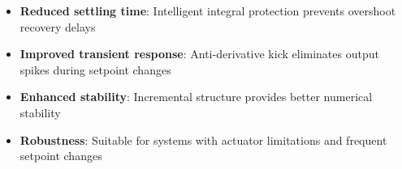 \documentclass{article}
\begin{document}
\begin{itemize}
    \item \textbf{Reduced settling time}: Intelligent integral protection prevents overshoot recovery delays
    \item \textbf{Improved transient response}: Anti-derivative kick eliminates output spikes during setpoint changes
    \item \textbf{Enhanced stability}: Incremental structure provides better numerical stability
    \item \textbf{Robustness}: Suitable for systems with actuator limitations and frequent setpoint changes
\end{itemize}
\end{document}
